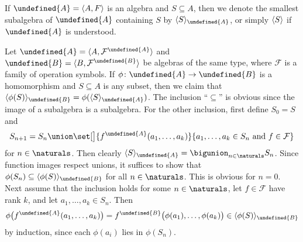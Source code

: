 \documentclass[article, a4paper, 11pt, oneside]{memoir}
\let\mathfrak\undefined
\numberwithin{equation}{chapter}
\newcommand{\calF}{\mathcal{F}}
\DeclarePairedDelimiter{\gen}{\langle}{\rangle} %
\newcommand{\frakA}{\mathfrak{A}}
\newcommand{\frakB}{\mathfrak{B}}
\theoremstyle{nonumberplain}
\begin{document}
\begin{remarkbreak}
    \label{rem:generating-subalgebra}
    If $\frakA = \langle A, F \rangle$ is an algebra and $S \subseteq A$, then we denote the smallest subalgebra of $\frakA$ containing $S$ by $\gen{S}_\frakA$, or simply $\gen{S}$ if $\frakA$ is understood.

    Let $\frakA = \langle A, \calF^\frakA \rangle$ and $\frakB = \langle B, \calF^\frakB \rangle$ be algebras of the same type, where $\calF$ is a family of operation symbols. If $\phi \colon \frakA \to \frakB$ is a homomorphism and $S \subseteq A$ is any subset, then we claim that $\gen{\phi(S)}_\frakB = \phi(\gen{S}_\frakA)$. The inclusion \enquote{$\subseteq$} is obvious since the image of a subalgebra is a subalgebra. For the other inclusion, first define $S_0 = S$ and
    \begin{equation*}
        S_{n+1}
            = S_n \union \set[\big]{f^\frakA(a_1, \ldots, a_k)}{a_1, \ldots, a_k \in S_n \text{ and } f \in \calF}
    \end{equation*}
    for $n \in \naturals$. Then clearly $\gen{S}_\frakA = \bigunion_{n\in\naturals} S_n$. Since function images respect unions, it suffices to show that $\phi(S_n) \subseteq \gen{\phi(S)}_\frakB$ for all $n \in \naturals$. This is obvious for $n = 0$. Next assume that the inclusion holds for some $n \in \naturals$, let $f \in \calF$ have rank $k$, and let $a_1, \ldots, a_k \in S_n$. Then
    \begin{equation*}
        \phi \bigl( f^\frakA(a_1, \ldots, a_k) \bigr)
            = f^\frakB \bigl( \phi(a_1), \ldots, \phi(a_k) \bigr)
            \in \gen{\phi(S)}_\frakB
    \end{equation*}
    by induction, since each $\phi(a_i)$ lies in $\phi(S_n)$.
\end{remarkbreak}
\end{document}

